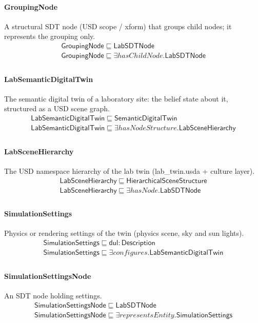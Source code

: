 \documentclass[10pt]{article}
\begin{document}
\paragraph{GroupingNode} A structural SDT node (USD scope / xform) that groups child nodes; it represents the grouping only.
\[\begin{array}{l}
\mathsf{GroupingNode} \sqsubseteq  \mathsf{LabSDTNode} \\
\mathsf{GroupingNode} \sqsubseteq  \exists \mathit{hasChildNode}.\mathsf{LabSDTNode} \\
\end{array}\]
\paragraph{LabSemanticDigitalTwin} The semantic digital twin of a laboratory site: the belief state about it, structured as a USD scene graph.
\[\begin{array}{l}
\mathsf{LabSemanticDigitalTwin} \sqsubseteq  \mathsf{SemanticDigitalTwin} \\
\mathsf{LabSemanticDigitalTwin} \sqsubseteq  \exists \mathit{hasNodeStructure}.\mathsf{LabSceneHierarchy} \\
\end{array}\]
\paragraph{LabSceneHierarchy} The USD namespace hierarchy of the lab twin (lab\_twin.usda + culture layer).
\[\begin{array}{l}
\mathsf{LabSceneHierarchy} \sqsubseteq  \mathsf{HierarchicalSceneStructure} \\
\mathsf{LabSceneHierarchy} \sqsubseteq  \exists \mathit{hasNode}.\mathsf{LabSDTNode} \\
\end{array}\]
\paragraph{SimulationSettings} Physics or rendering settings of the twin (physics scene, sky and sun lights).
\[\begin{array}{l}
\mathsf{SimulationSettings} \sqsubseteq  \mathsf{dul{:}Description} \\
\mathsf{SimulationSettings} \sqsubseteq  \exists \mathit{configures}.\mathsf{LabSemanticDigitalTwin} \\
\end{array}\]
\paragraph{SimulationSettingsNode} An SDT node holding settings.
\[\begin{array}{l}
\mathsf{SimulationSettingsNode} \sqsubseteq  \mathsf{LabSDTNode} \\
\mathsf{SimulationSettingsNode} \sqsubseteq  \exists \mathit{representsEntity}.\mathsf{SimulationSettings} \\
\end{array}\]
\end{document}
